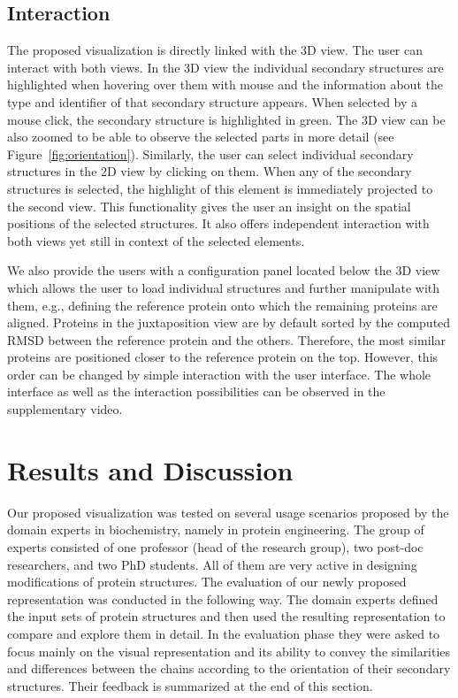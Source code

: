 \documentclass[twocolumn]{bmcart}%
\begin{document}
\subsection*{Interaction}
The proposed visualization is directly linked with the 3D view.
The user can interact with both views.
In the 3D view the individual secondary structures are highlighted when hovering over them with mouse and the information about the type and identifier of that secondary structure appears.
When selected by a mouse click, the secondary structure is highlighted in green.
The 3D view can be also zoomed to be able to observe the selected parts in more detail (see Figure~\ref{fig:orientation}).
Similarly, the user can select individual secondary structures in the 2D view by clicking on them.
When any of the secondary structures is selected, the highlight of this element is immediately projected to the second view.
This functionality gives the user an insight on the spatial positions of the selected structures.
It also offers independent interaction with both views yet still in context of the selected elements.

We also provide the users with a configuration panel located below the 3D view which allows the user to load individual structures and further manipulate with them, e.g., defining the reference protein onto which the remaining proteins are aligned.
Proteins in the juxtaposition view are by default sorted by the computed RMSD between the reference protein and the others.
Therefore, the most similar proteins are positioned closer to the reference protein on the top.
However, this order can be changed by simple interaction with the user interface.   
The whole interface as well as the interaction possibilities can be observed in the supplementary video.

\section*{Results and Discussion}
Our proposed visualization was tested on several usage scenarios proposed by the domain experts in biochemistry, namely in protein engineering.
The group of experts consisted of one professor (head of the research group), two post-doc researchers, and two PhD students.
All of them are very active in designing modifications of protein structures.
The evaluation of our newly proposed representation was conducted in the following way.
The domain experts defined the input sets of protein structures and then used the resulting representation to compare and explore them in detail. 
In the evaluation phase they were asked to focus mainly on the visual representation and its ability to convey the similarities and differences between the chains according to the orientation of their secondary structures.
Their feedback is summarized at the end of this section.
\end{document}
